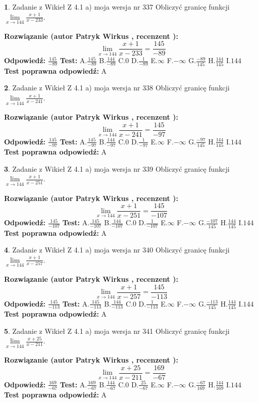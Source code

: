 \documentclass[12pt, a4paper]{article}
\theoremstyle{definition} %
\newtheorem{zad}{}
\newcommand{\zadStart}[1]{\begin{zad}#1\newline}
\newcommand{\zadStop}{\end{zad}}
\newcommand{\rozwStart}[2]{\noindent \textbf{Rozwiązanie (autor #1 , recenzent #2): }\newline}
\newcommand{\rozwStop}{\newline}
\newcommand{\odpStart}{\noindent \textbf{Odpowiedź:}\newline}
\newcommand{\odpStop}{\newline}
\newcommand{\testStart}{\noindent \textbf{Test:}\newline}
\newcommand{\testStop}{\newline}
\newcommand{\kluczStart}{\noindent \textbf{Test poprawna odpowiedź:}\newline}
\newcommand{\kluczStop}{\newline}
\begin{document}
\zadStart{Zadanie z Wikieł Z 4.1 a) moja wersja nr 337}
Obliczyć granicę funkcji $\lim\limits_{x\to144}\frac{x+1}{x-233}$.
\zadStop
\rozwStart{Patryk Wirkus}{}
$$\lim\limits_{x\to144}\frac{x+1}{x-233} = \frac{145}{-89}$$
\rozwStop
\odpStart
$\frac{145}{-89}$
\odpStop
\testStart
A.$\frac{145}{-89}$
B.$\frac{144}{-89}$
C.$0$
D.$\frac{1}{-89}$
E.$\infty$
F.$-\infty$
G.$\frac{-89}{145}$
H.$\frac{144}{145}$
I.$144$
\testStop
\kluczStart
A
\kluczStop



\zadStart{Zadanie z Wikieł Z 4.1 a) moja wersja nr 338}
Obliczyć granicę funkcji $\lim\limits_{x\to144}\frac{x+1}{x-241}$.
\zadStop
\rozwStart{Patryk Wirkus}{}
$$\lim\limits_{x\to144}\frac{x+1}{x-241} = \frac{145}{-97}$$
\rozwStop
\odpStart
$\frac{145}{-97}$
\odpStop
\testStart
A.$\frac{145}{-97}$
B.$\frac{144}{-97}$
C.$0$
D.$\frac{1}{-97}$
E.$\infty$
F.$-\infty$
G.$\frac{-97}{145}$
H.$\frac{144}{145}$
I.$144$
\testStop
\kluczStart
A
\kluczStop



\zadStart{Zadanie z Wikieł Z 4.1 a) moja wersja nr 339}
Obliczyć granicę funkcji $\lim\limits_{x\to144}\frac{x+1}{x-251}$.
\zadStop
\rozwStart{Patryk Wirkus}{}
$$\lim\limits_{x\to144}\frac{x+1}{x-251} = \frac{145}{-107}$$
\rozwStop
\odpStart
$\frac{145}{-107}$
\odpStop
\testStart
A.$\frac{145}{-107}$
B.$\frac{144}{-107}$
C.$0$
D.$\frac{1}{-107}$
E.$\infty$
F.$-\infty$
G.$\frac{-107}{145}$
H.$\frac{144}{145}$
I.$144$
\testStop
\kluczStart
A
\kluczStop



\zadStart{Zadanie z Wikieł Z 4.1 a) moja wersja nr 340}
Obliczyć granicę funkcji $\lim\limits_{x\to144}\frac{x+1}{x-257}$.
\zadStop
\rozwStart{Patryk Wirkus}{}
$$\lim\limits_{x\to144}\frac{x+1}{x-257} = \frac{145}{-113}$$
\rozwStop
\odpStart
$\frac{145}{-113}$
\odpStop
\testStart
A.$\frac{145}{-113}$
B.$\frac{144}{-113}$
C.$0$
D.$\frac{1}{-113}$
E.$\infty$
F.$-\infty$
G.$\frac{-113}{145}$
H.$\frac{144}{145}$
I.$144$
\testStop
\kluczStart
A
\kluczStop



\zadStart{Zadanie z Wikieł Z 4.1 a) moja wersja nr 341}
Obliczyć granicę funkcji $\lim\limits_{x\to144}\frac{x+25}{x-211}$.
\zadStop
\rozwStart{Patryk Wirkus}{}
$$\lim\limits_{x\to144}\frac{x+25}{x-211} = \frac{169}{-67}$$
\rozwStop
\odpStart
$\frac{169}{-67}$
\odpStop
\testStart
A.$\frac{169}{-67}$
B.$\frac{144}{-67}$
C.$0$
D.$\frac{25}{-67}$
E.$\infty$
F.$-\infty$
G.$\frac{-67}{169}$
H.$\frac{144}{169}$
I.$144$
\testStop
\kluczStart
A
\kluczStop
\end{document}

